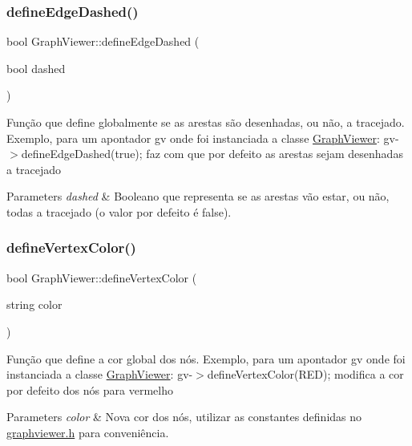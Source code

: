 \subsubsection{\texorpdfstring{define\+Edge\+Dashed()}{defineEdgeDashed()}}
{\footnotesize\ttfamily bool Graph\+Viewer\+::define\+Edge\+Dashed (\begin{DoxyParamCaption}\item[{bool}]{dashed }\end{DoxyParamCaption})}

Função que define globalmente se as arestas são desenhadas, ou não, a tracejado. Exemplo, para um apontador gv onde foi instanciada a classe \hyperlink{class_graph_viewer}{Graph\+Viewer}\+: gv-\/$>$define\+Edge\+Dashed(true); faz com que por defeito as arestas sejam desenhadas a tracejado


\begin{DoxyParams}{Parameters}
{\em dashed} & Booleano que representa se as arestas vão estar, ou não, todas a tracejado (o valor por defeito é false). \\
\hline
\end{DoxyParams}
\mbox{\label{class_graph_viewer_a76de8676b7a93d72af514b84cdaa4d21}} 
\subsubsection{\texorpdfstring{define\+Vertex\+Color()}{defineVertexColor()}}
{\footnotesize\ttfamily bool Graph\+Viewer\+::define\+Vertex\+Color (\begin{DoxyParamCaption}\item[{string}]{color }\end{DoxyParamCaption})}

Função que define a cor global dos nós. Exemplo, para um apontador gv onde foi instanciada a classe \hyperlink{class_graph_viewer}{Graph\+Viewer}\+: gv-\/$>$define\+Vertex\+Color(\+R\+E\+D); modifica a cor por defeito dos nós para vermelho


\begin{DoxyParams}{Parameters}
{\em color} & Nova cor dos nós, utilizar as constantes definidas no \hyperlink{graphviewer_8h_source}{graphviewer.\+h} para conveniência. \\
\hline
\end{DoxyParams}
\mbox{\label{class_graph_viewer_af1adb6a361457187a820e01dcf0a34b7}} 
